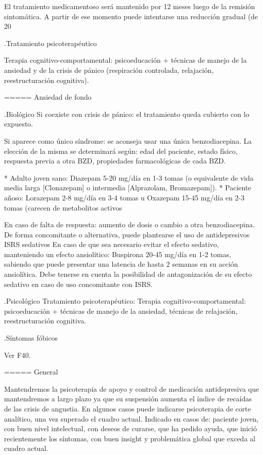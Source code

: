 \documentclass{scrbook}
\begin{document}
El tratamiento medicamentoso será mantenido por 12 meses luego de la remisión sintomática. A partir de ese momento puede intentarse una reducción gradual (de 20%

.Tratamiento psicoterapéutico

Terapia cognitivo-comportamental: psicoeducación + técnicas de manejo de la ansiedad y de la crisis de pánico (respiración controlada, relajación, reestructuración cognitiva).

===== Ansiedad de fondo

.Biológico
Si coexiste con crisis de pánico: el tratamiento queda cubierto con lo expuesto.

Si aparece como único síndrome: se aconseja usar una única benzodiacepina. La elección de la misma se determinará según: edad del paciente, estado físico, respuesta previa a otra BZD, propiedades farmacológicas de cada BZD.

* Adulto joven sano: Diazepam 5-20 mg/día en 1-3 tomas (o equivalente de vida media larga [Clonazepam] o intermedia [Alprazolam, Bromazepam]).
* Paciente añoso: Lorazepam 2-8 mg/día en 3-4 tomas u Oxazepam 15-45 mg/día en 2-3 tomas (carecen de metabolitos activos

En caso de falta de respuesta: aumento de dosis o cambio a otra benzodiacepina. De forma concomitante o alternativa, puede plantearse el uso de antidepresivos ISRS sedativos En caso de que sea necesario evitar el efecto sedativo, manteniendo un efecto ansiolítico: Buspirona 20-45 mg/día en 1-2 tomas, sabiendo que puede presentar una latencia de hasta 2 semanas en su acción ansiolítica. Debe tenerse en cuenta la posibilidad de antagonización de su efecto sedativo en caso de uso concomitante con ISRS.

.Psicológico
Tratamiento psicoterapéutico: Terapia cognitivo-comportamental: psicoeducación + técnicas de manejo de la ansiedad, técnicas de relajación, reestructuración cognitiva.

.Síntomas fóbicos

Ver F40. 

===== General

Mantendremos la psicoterapia de apoyo y control de medicación antidepresiva que mantendremos a largo plazo ya que su suspensión aumenta el índice de recaídas de las crisis de angustia. En algunos casos puede indicarse psicoterapia de corte analítico, una vez superado el cuadro actual. Indicado en casos de: paciente joven, con buen nivel intelectual, con deseos de curarse, que ha pedido ayuda, que inició recientemente los síntomas, con buen insight y problemática global que exceda al cuadro actual.
\end{document}
